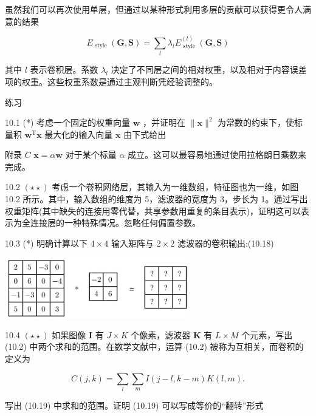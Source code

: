 \documentclass[10pt]{article}
\begin{document}
虽然我们可以再次使用单层，但通过以某种形式利用多层的贡献可以获得更令人满意的结果

\[
{E}_{\text{ style }}\left( {\mathbf{G},\mathbf{S}}\right)  = \mathop{\sum }\limits_{l}{\lambda }_{l}{E}_{\text{ style }}^{\left( l\right) }\left( {\mathbf{G},\mathbf{S}}\right)  \tag{10.17}
\]

其中 \(l\) 表示卷积层。系数 \({\lambda }_{l}\) 决定了不同层之间的相对权重，以及相对于内容误差项的权重。这些权重系数是通过主观判断凭经验调整的。

练习

10.1 (*) 考虑一个固定的权重向量 \(\mathbf{w}\) ，并证明在 \(\parallel \mathbf{x}{\parallel }^{2}\) 为常数的约束下，使标量积 \({\mathbf{w}}^{\mathrm{T}}\mathbf{x}\) 最大化的输入向量 \(\mathbf{x}\) 由下式给出

附录 \(C\)  \(\mathbf{x} = \alpha \mathbf{w}\) 对于某个标量 \(\alpha\) 成立。这可以最容易地通过使用拉格朗日乘数来完成。

10.2 \(\left( {\star  \star  }\right)\) 考虑一个卷积网络层，其输入为一维数组，特征图也为一维，如图 10.2 所示。其中，输入数组的维度为 5，滤波器的宽度为 3，步长为 1。通过写出权重矩阵(其中缺失的连接用零代替，共享参数用重复的条目表示)，证明这可以表示为全连接层的一种特殊情况。忽略任何偏置参数。

10.3 (*) 明确计算以下 \(4 \times  4\) 输入矩阵与 \(2 \times  2\) 滤波器的卷积输出:(10.18)

\begin{center}
\includegraphics[max width=0.6\textwidth]{images/0194e279-9b28-703a-88f4-c3ac21e2010d_341_581_885_756_247_0.jpg}
\end{center}
\hspace*{3em} 

10.4 \(\left( {\star  \star  }\right)\) 如果图像 \(\mathbf{I}\) 有 \(J \times  K\) 个像素，滤波器 \(\mathbf{K}\) 有 \(L \times  M\) 个元素，写出 (10.2) 中两个求和的范围。在数学文献中，运算 (10.2) 被称为互相关，而卷积的定义为

\[
C\left( {j,k}\right)  = \mathop{\sum }\limits_{l}\mathop{\sum }\limits_{m}I\left( {j - l,k - m}\right) K\left( {l,m}\right) . \tag{10.19}
\]

写出 (10.19) 中求和的范围。证明 (10.19) 可以写成等价的“翻转”形式
\end{document}
